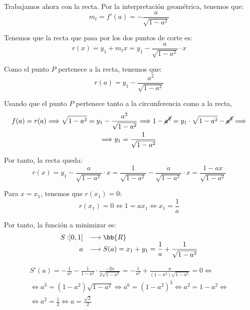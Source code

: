 \documentclass[12pt]{article}
\begin{document}
\begin{ejercicio} 
    \vspace{1cm}
    Trabajamos ahora con la recta. Por la interpretación geométrica, tenemos que:
    \begin{equation*}
        m_t = f'(a) = -\frac{a}{\sqrt{1-a^2}}
    \end{equation*}

    Tenemos que la recta que pasa por los dos puntos de corte es:
    \begin{equation*}
        r(x)=y_1 + m_tx = y_1 -\frac{a}{\sqrt{1-a^2}} \cdot x
    \end{equation*}
    
    Como el punto $P$ pertenece a la recta, tenemos que:
    \begin{equation*}
        r(a)=y_1 -\frac{a^2}{\sqrt{1-a^2}}
    \end{equation*}

    Usando que el punto $P$ pertenece tanto a la circunferencia como a la recta,
    \begin{multline*}
        f(a)=r(a) \Longrightarrow \sqrt{1-a^2} = y_1 -\frac{a^2}{\sqrt{1-a^2}} \Longrightarrow 1-\cancel{a^2} = y_1\cdot \sqrt{1-a^2} -\cancel{a^2}
        \Longrightarrow \\ \Longrightarrow
        y_1 = \frac{1}{\sqrt{1-a^2}}
    \end{multline*}

    Por tanto, la recta queda:
    \begin{equation*}
        r(x) = y_1 -\frac{a}{\sqrt{1-a^2}} \cdot x =  \frac{1}{\sqrt{1-a^2}} -\frac{a}{\sqrt{1-a^2}} \cdot x = \frac{1-ax}{\sqrt{1-a^2}}
    \end{equation*}

    Para $x=x_1$, tenemos que $r(x_1)=0$:
    \begin{equation*}
        r(x_1) = 0 \Longleftrightarrow 1=ax_1 \Longleftrightarrow x_1=\frac{1}{a}
    \end{equation*}

    Por tanto, la función a minimizar es:
    \begin{equation*}
        \begin{array}{rl}
            S:]0, 1[ & \longrightarrow \bb{R}\\
                    a & \longrightarrow S(a) = x_1 + y_1 = \displaystyle \frac{1}{a} + \frac{1}{\sqrt{1-a^2}}
        \end{array}
    \end{equation*}

    \begin{multline*}
        S'(a)=-\frac{1}{a^2} -\frac{1}{1-a^2} \cdot \frac{-2a}{2\sqrt{1-a^2}} = -\frac{1}{a^2} +\frac{a}{(1-a^2)\sqrt{1-a^2}} = 0
        \Longleftrightarrow \\\Longleftrightarrow
        a^3 = (1-a^2)\sqrt{1-a^2} \Longleftrightarrow a^6 = (1-a^2)^3 \Longleftrightarrow a^2 = 1-a^2
        \Longleftrightarrow \\\Longleftrightarrow
        a^2 = \frac{1}{2} \Longleftrightarrow a=\frac{\sqrt{2}}{2}
    \end{multline*}


\end{ejercicio}
\end{document}
